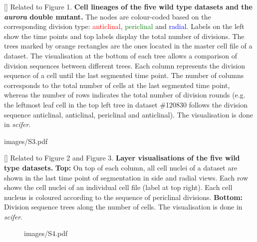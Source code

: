 []{
Related to Figure 1.
{\bf Cell lineages of the five wild type datasets and the \emph{aurora} double mutant.} The nodes are colour-coded based on the corresponding division type: \textcolor{red}{anticlinal}, \textcolor{green}{periclinal} and \textcolor{blue}{radial}. Labels on the left show the time points and top labels display the total number of divisions. The trees marked by orange rectangles are the ones located in the master cell file of a dataset. The visualisation at the bottom of each tree allows a comparison of division sequences between different trees. Each column represents the division sequence of a cell until the last segmented time point. The number of columns corresponds to the total number of cells at the last segmented time point, whereas the number of rows indicates the total number of division rounds (e.g. the leftmost leaf cell in the top left tree in dataset \#120830 follows the division sequence anticlinal, anticlinal, periclinal and anticlinal). The visualisation is done in \textit{scifer}.
}
\label{fig:S2}
%
\clearpage
%
\begin{sidewaysfigure}
\centering
	\begin{overpic}[width=1.\linewidth]{images/S3.pdf}
	\end{overpic}
\end{sidewaysfigure}
\clearpage
{}[]{
Related to Figure 2 and Figure 3.
{\bf Layer visualisations of the five wild type datasets.} {\bf Top:} On top of each column, all cell nuclei of a dataset are shown in the last time point of segmentation in side and radial views. Each row shows the cell nuclei of an individual cell file (label at top right). Each cell nucleus is coloured according to the sequence of periclinal divisions. {\bf Bottom:} Division sequence trees along the number of cells. The visualisation is done in \textit{scifer}.
}
\label{fig:S3}
%
\clearpage
%
\begin{figure}[htbp]
\centering
	\begin{overpic}[width=1.\linewidth]{images/S4.pdf}
	\end{overpic}
\end{figure}
\clearpage
